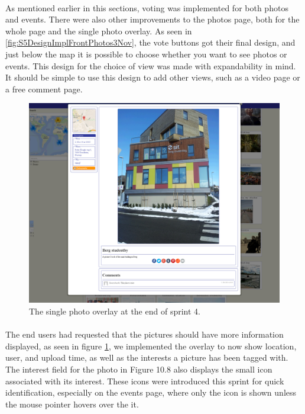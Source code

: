 \paragraph{} As mentioned earlier in this sections, voting was implemented for both photos and events. There were also other improvements to the photos page, both for the whole page and the single photo overlay. As seen in \ref{fig:S5DesignImplFrontPhotos3Nov}, the vote buttons got their final design, and just below the map it is possible to choose whether you want to see photos or events. This design for the choice of view was made with expandability in mind. It should be simple to use this design to add other views, such as a video page or a free comment page.

\begin{figure}[ht!]
  \centering
  \includegraphics[width=\linewidth]{./img/webpage/3Nov/PhotoOverlay}
  \caption{The single photo overlay at the end of sprint 4.}
  \label{fig:S5DesignImplPhotoOverlay3Nov}
\end{figure}

\paragraph{} The end users had requested that the pictures should have more information displayed, as seen in figure \ref{fig:S5DesignImplPhotoOverlay3Nov}, we implemented the overlay to now show location, user, and upload time, as well as the interests a picture has been tagged with. The interest field for the photo in Figure 10.8 also displays the small icon associated with its interest. These icons were introduced this sprint for quick identification, especially on the events page, where only the icon is shown unless the mouse pointer hovers over the it.

